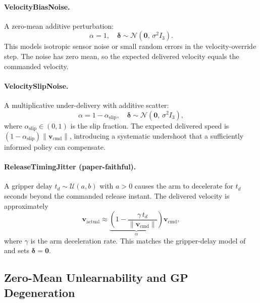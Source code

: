 \paragraph{VelocityBiasNoise.}
A zero-mean additive perturbation:
\begin{equation}
  \alpha = 1, \quad \boldsymbol{\delta} \sim \mathcal{N}(\mathbf{0},\, \sigma^2 I_3).
  \label{eq:bias_noise}
\end{equation}
This models isotropic sensor noise or small random errors in the velocity-override
step.  The noise has zero mean, so the expected delivered velocity equals the commanded
velocity.

\paragraph{VelocitySlipNoise.}
A multiplicative under-delivery with additive scatter:
\begin{equation}
  \alpha = 1 - \alpha_{\mathrm{slip}}, \quad \boldsymbol{\delta} \sim \mathcal{N}(\mathbf{0},\, \sigma^2 I_3),
  \label{eq:slip_noise}
\end{equation}
where $\alpha_{\mathrm{slip}} \in (0, 1)$ is the slip fraction.  The expected
delivered speed is $(1 - \alpha_{\mathrm{slip}})\|\mathbf{v}_{\mathrm{cmd}}\|$,
introducing a systematic undershoot that a sufficiently informed policy can compensate.

\paragraph{ReleaseTimingJitter (paper-faithful).}
A gripper delay $t_d \sim \mathcal{U}(a, b)$ with $a > 0$ causes the arm to decelerate
for $t_d$ seconds beyond the commanded release instant.
The delivered velocity is approximately
\begin{equation}
  \mathbf{v}_{\mathrm{actual}} \approx
    \underbrace{\left(1 - \frac{\gamma\,t_d}{\|\mathbf{v}_{\mathrm{cmd}}\|}\right)}_{\alpha}
    \mathbf{v}_{\mathrm{cmd}},
  \label{eq:jitter_noise}
\end{equation}
where $\gamma$ is the arm deceleration rate.  This matches the gripper-delay model of
\cite{turcato2025mcpilot} and sets $\boldsymbol{\delta} = \mathbf{0}$.

\subsection{Zero-Mean Unlearnability and GP Degeneration}
\label{sec:study2:theory}

